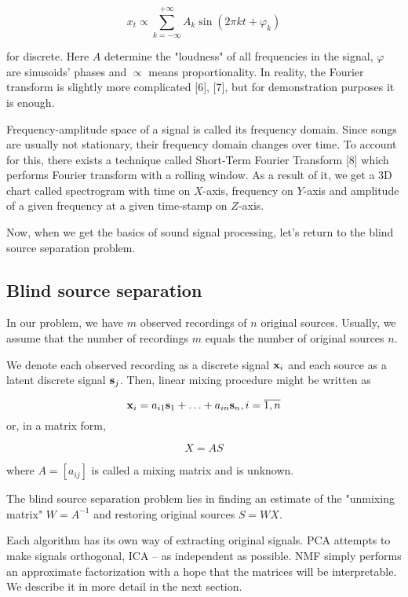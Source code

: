 \documentclass[../main.tex]{subfiles} %
\begin{document}
\[x_t \propto \sum_{k=-\infty}^{+\infty} A_k \sin(2 \pi k t + \varphi_k)\]

for discrete. 
Here $A$ determine the "loudness" of all frequencies in the signal, $\varphi$ are sinusoids' phases and $\propto$ means proportionality. 
In reality, the Fourier transform is slightly more complicated [6], [7], but for demonstration purposes it is enough.

Frequency-amplitude space of a signal is called its frequency domain.
Since songs are usually not stationary, their frequency domain changes over time. 
To account for this, there exists a technique called Short-Term Fourier Transform [8] which performs Fourier transform with a rolling window. 
As a result of it, we get a 3D chart called spectrogram with time on $X$-axis, frequency on $Y$-axis and amplitude of a given frequency at a given time-stamp on $Z$-axis.

Now, when we get the basics of sound signal processing, let's return to the blind source separation problem.

\subsection{Blind source separation}

In our problem, we have $m$ observed recordings of $n$ original sources. Usually, we assume that the number of recordings $m$ equals the number of original sources $n$.

We denote each observed recording as a discrete signal ${\mathbf x}_i$ and each source as a latent discrete signal ${\mathbf s}_j$. Then, linear mixing procedure might be written as

\begin{equation}
{\mathbf x}_i = a_{i1} {\mathbf s}_1 + \ldots + a_{in} {\mathbf s}_n, i = \overline{1, n}
\end{equation}
or, in a matrix form,

\begin{equation}
X = A S
\end{equation}

where $A = \left[a_{ij} \right]$ is called a mixing matrix and is unknown. 

The blind source separation problem lies in finding an estimate of the "unmixing matrix" $W = A^{-1}$  and restoring original sources $S = W X$. 

Each algorithm has its own way of extracting original signals. PCA attempts to make signals orthogonal, ICA -- as independent as possible. NMF simply performs an approximate factorization with a hope that the matrices will be interpretable. We describe it in more detail in the next section.
\end{document}
